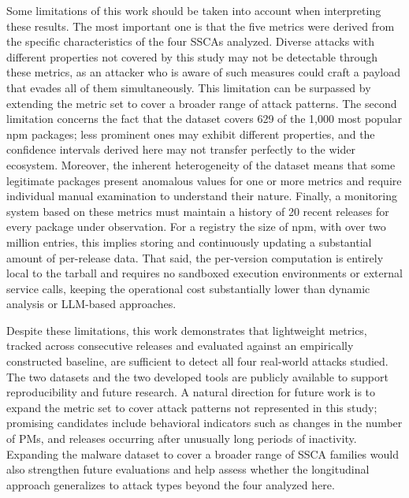 Some limitations of this work should be taken into account when interpreting these results.
The most important one is that the five metrics were derived from the specific characteristics of the four \acp{SSCA} analyzed.
Diverse attacks with different properties not covered by this study may not be detectable through these metrics,
as an attacker who is aware of such measures could craft a payload that evades all of them simultaneously.
This limitation can be surpassed by extending the metric set to cover a broader range of attack patterns.
The second limitation concerns the fact that the dataset covers 629 of the 1,000 most popular \ac{npm} packages; 
less prominent ones may exhibit different properties,
and the confidence intervals derived here may not transfer perfectly to the wider ecosystem.
Moreover, the inherent heterogeneity of the dataset means that some legitimate packages
present anomalous values for one or more metrics and require individual manual examination to understand their nature.
Finally, a monitoring system based on these metrics must maintain a history of 20 recent releases for every package under observation.
For a registry the size of \ac{npm}, with over two million entries, this implies storing and continuously updating a substantial amount of per-release data.
That said, the per-version computation is entirely local to the tarball and requires no sandboxed execution environments
or external service calls, keeping the operational cost substantially lower than dynamic analysis or \ac{LLM}-based approaches.

Despite these limitations, this work demonstrates that lightweight metrics, 
tracked across consecutive releases and evaluated against an empirically constructed baseline, 
are sufficient to detect all four real-world attacks studied.
The two datasets and the two developed tools are publicly available to support reproducibility and future research.
A natural direction for future work is to expand the metric set to cover attack patterns not represented in this study;
promising candidates include behavioral indicators such as changes in the number of \acp{PM}, 
and releases occurring after unusually long periods of inactivity.
Expanding the malware dataset to cover a broader range of \ac{SSCA} families would also strengthen future evaluations
and help assess whether the longitudinal approach generalizes to attack types beyond the four analyzed here.
